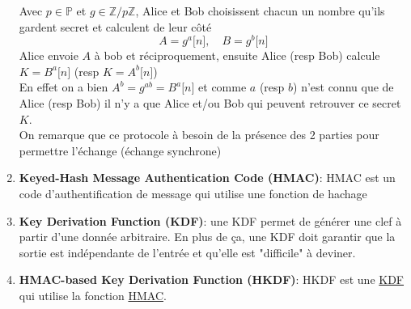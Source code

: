 \documentclass[a4paper, 12pt]{article}
\begin{document}
\begin{enumerate}
\noindent Avec $p \in \mathbb{P}$ et $g\in \mathbb{Z}/p\mathbb{Z}$, Alice et Bob choisissent chacun un nombre qu'ils gardent secret et calculent de leur côté 
$$
A = g^a \lbrack n \rbrack, \quad B = g^b \lbrack n \rbrack 
$$
Alice envoie $A$ à bob et réciproquement, ensuite Alice (resp Bob) calcule $K = B^a \lbrack n \rbrack$ (resp $K = A^b \lbrack n \rbrack$) \\

\noindent En effet on a bien $A^b = g^{ab} = B^a \lbrack n \rbrack$ et comme $a$ (resp $b$) n'est connu que de Alice (resp Bob) il n'y a que Alice et/ou Bob qui peuvent retrouver ce secret $K$.\\

\noindent On remarque que ce protocole à besoin de la présence des 2 parties pour permettre l'échange (échange synchrone)	
\item \textbf{Keyed-Hash Message Authentication Code (HMAC)}\label{HMAC}: HMAC est un code d'authentification de message qui utilise une fonction de hachage
\item \textbf{Key Derivation Function (KDF)}\label{KDF}: une KDF permet de générer une clef à partir d'une donnée arbitraire. En plus de ça, une KDF doit garantir que la sortie est indépendante de l'entrée et qu'elle est "difficile" à deviner. 
\item \textbf{HMAC-based Key Derivation Function (HKDF)}\label{HKDF}: HKDF est une \hyperref[KDF]{KDF} qui utilise la fonction \hyperref[HMAC]{HMAC}.


\end{enumerate}
\end{document}
